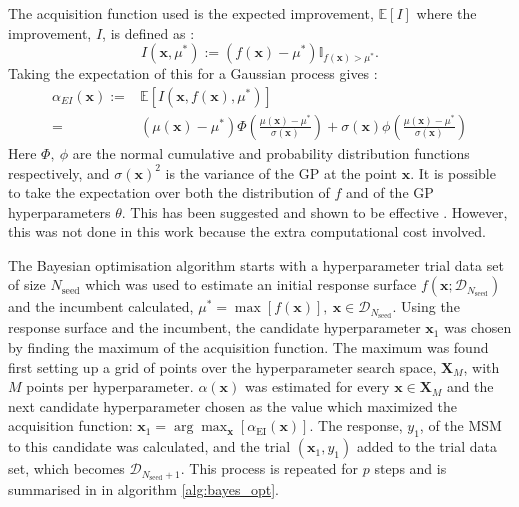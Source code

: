 The acquisition function used is the expected improvement, $\mathbb{E}\left[I\right]$ where the improvement, $I$, is defined as \cite{shahriariTakingHumanOut2016}:
\begin{equation}
    I(\mathbf{x}, \mu^{*}):=(f(\mathbf{x}) - \mu^{*}) \mathbb{I}_{f(\mathbf{x}) > \mu^{*}}.
\end{equation}
Taking the expectation of this for a Gaussian process gives \cite{shahriariTakingHumanOut2016}:
\begin{align}\label{eqn:msm_ei_def}
        \alpha_{EI}(\mathbf{x}) := &  \mathbb{E}\left[I(\mathbf{x}, f(\mathbf{x}), \mu^{*})\right] \\
         =  &(\mu(\mathbf{x}) - \mu^{*})\Phi\left( \frac{ \mu(\mathbf{x}) - \mu^{*} }{\sigma(\mathbf{x})} \right ) + \sigma(\mathbf{x})\phi\left( \frac{ \mu(\mathbf{x}) - \mu^{*} }{\sigma(\mathbf{x}) } \right )
\end{align}
Here $\Phi,\ \phi$ are the normal cumulative and probability distribution functions respectively, and $\sigma(\mathbf{x})^{2}$ is the variance of the GP at the point $\mathbf{x}$. It is possible to take the expectation over both the distribution of $f$ and of the GP hyperparameters $\theta$. This has been suggested and shown to be effective \cite{NIPS2012_4522}. However, this was not done in this work because the extra computational cost involved. 

The Bayesian optimisation algorithm \cite{shahriariTakingHumanOut2016} starts with a hyperparameter trial data set of size $N_{\mathrm{seed}}$ which was used to estimate an initial response surface $f(\mathbf{x}; \mathcal{D}_{N_{\mathrm{seed}}})$ and the incumbent calculated, $\mu^{*} = \max{\left[f(\mathbf{x})\right]},\ \mathbf{x}\in \mathcal{D}_{N_{\mathrm{seed}}}$. Using the response surface and the incumbent, the  candidate hyperparameter $\mathbf{x}_{1}$ was chosen by finding the maximum of the acquisition function. The maximum was found first setting up a grid of points over the hyperparameter search space, $\mathbf{X}_{M}$, with $M$ points per hyperparameter.  $\alpha(\mathbf{x})$ was estimated for every $\mathbf{x}\in \mathbf{X}_{M}$ and the next candidate hyperparameter chosen as the value which maximized the acquisition function: $\mathbf{x}_{1} = \arg\max_{\mathbf{x}}\left[ \alpha_{\mathrm{EI}}(\mathbf{x})\right]$. The response, $y_{1}$, of the MSM to this candidate was calculated, and the trial $(\mathbf{x}_{1}, y_{1})$ added to the trial data set, which becomes  $\mathcal{D}_{N_{\mathrm{seed}}+1}$. This process is repeated for $p$ steps and is summarised in in algorithm \ref{alg:bayes_opt}.

